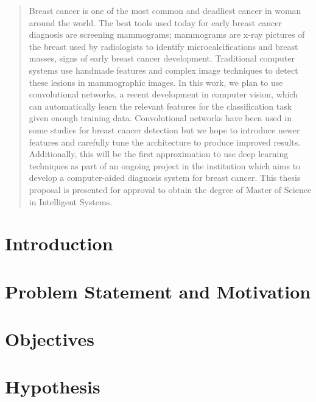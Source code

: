\documentclass[11pt]{article}
\begin{document}
\propportada                        %
\proppagfirmas                      %
\thispagestyle{empty}
\tableofcontents                    %
\newpage
\sloppy
\newpage
{}

\begin{abstract}
Breast cancer is one of the most common and deadliest cancer in woman around the world. The best tools used today for early breast cancer diagnosis are screening mammograms; mammograms are x-ray pictures of the breast used by radiologists to identify microcalcifications and breast masses, signs of early breast cancer development. Traditional computer systems use handmade features and complex image techniques to detect these lesions in mammographic images. In this work, we plan to use convolutional networks, a recent development in computer vision, which can automatically learn the relevant features for the classification task given enough training data. Convolutional networks have been used in some studies for breast cancer detection but we hope to introduce newer features and carefully tune the architecture to produce improved results. Additionally, this will be the first approximation to use deep learning techniques as part of an ongoing project in the institution which aims to develop a computer-aided diagnosis system for breast cancer. This thesis proposal is presented for approval to obtain the degree of Master of Science in Intelligent Systems.
\end{abstract}

\section{Introduction}


\section{Problem Statement and Motivation}
\label{sec:ProblemDefinition}


\section{Objectives}
\label{sec:Objectives}


\section{Hypothesis}
\label{sec:Hypothesis}

\end{document}
